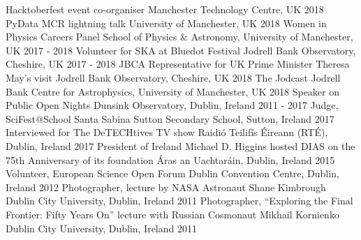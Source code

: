 \begin{cvpress}
   \cvpres
   {Hacktoberfest event co-organiser}
    {Manchester Technology Centre, UK}
    {2018}
   \cvpres
   {PyData MCR lightning talk}
    {University of Manchester, UK}
    {2018}
   \cvpres
   {Women in Physics Careers Panel}
    {School of Physics \& Astronomy, University of Manchester, UK}
    {2017 - 2018}
   \cvpres
   {Volunteer for SKA at Bluedot Festival}
    {Jodrell Bank Observatory, Cheshire, UK}
    {2017 - 2018}
   \cvpres
   {JBCA Representative for UK Prime Minister Theresa May's visit}
    {Jodrell Bank Observatory, Cheshire, UK}
    {2018}
   \cvpres
   {The Jodcast}
    {Jodrell Bank Centre for Astrophysics, University of Manchester, UK}
    {2018}
   \cvpres
   {Speaker on Public Open Nights}
    {Dunsink Observatory, Dublin, Ireland}
    {2011 - 2017}
   \cvpres
   {Judge, SciFest@School}
    {Santa Sabina Sutton Secondary School, Sutton, Ireland}
    {2017}
   \cvpres
   {Interviewed for The DeTECHtives TV show}
    {Raidi{\'o} Teilif{\'i}s {\'E}ireann (RT{\'E}), Dublin, Ireland}
    {2017}
   \cvpres
   {President of Ireland Michael D. Higgins hosted DIAS on the 75th Anniversary of its foundation}
    {{\'A}ras an Uachtar{\'a}in, Dublin, Ireland}
    {2015}
   \cvpres
   {Volunteer, European Science Open Forum}
    {Dublin Convention Centre, Dublin, Ireland}
    {2012}
   \cvpres
   {Photographer, lecture by NASA Astronaut Shane Kimbrough}
    {Dublin City University, Dublin, Ireland}
    {2011}
   \cvpres
   {Photographer, ``Exploring the Final Frontier: Fifty Years On'' lecture with Russian Cosmonaut Mikhail Kornienko}
    {Dublin City University, Dublin, Ireland}
    {2011}
\end{cvpress}


